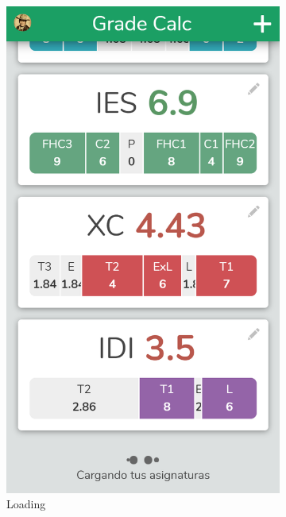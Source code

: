 \vfill
\begin{figure}[ht!]
    \begin{subfigure}[b]{0.3333\textwidth-0.1cm}
        \centering
        \includegraphics[width=\textwidth]{media/screenshots/screenshot-loader-cargando.png}
        \caption{Loading}
    \end{subfigure}
    \hfill
    \begin{subfigure}[b]{0.3333\textwidth-0.1cm}
        \centering

\end{subfigure}
\end{figure}

